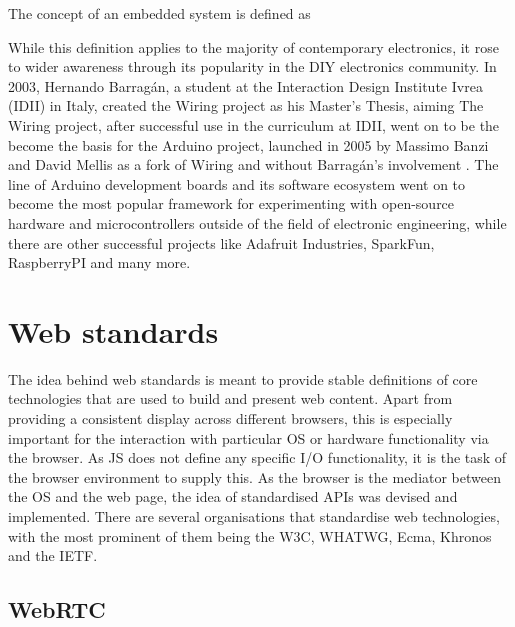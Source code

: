 The concept of an embedded system is defined as 

While this definition applies to the majority of contemporary electronics, it rose to wider awareness through its popularity in the \ac{DIY} electronics community. In 2003, Hernando Barragán, a student at the Interaction Design Institute Ivrea (IDII) in Italy, created the Wiring project as his Master's Thesis, aiming  The Wiring project, after successful use in the curriculum at IDII, went on to be the become the basis for the Arduino project, launched in 2005 by Massimo Banzi and David Mellis as a fork of Wiring and without Barragán's involvement \parencite{arduinoHistory}. The line of Arduino development boards and its software ecosystem went on to become the most popular framework for experimenting with open-source hardware and microcontrollers outside of the field of electronic engineering, while there are other successful projects like Adafruit Industries, SparkFun, RaspberryPI and many more.


\section{Web standards}

The idea behind web standards is meant to provide stable definitions of core technologies that are used to build and present web content. Apart from providing a consistent display across different browsers, this is especially important for the interaction with particular \ac{OS} or hardware functionality via the browser. As \ac{JS} does not define any specific \ac{I/O} functionality, it is the task of the browser environment to supply this. As the browser is the mediator between the \ac{OS} and the web page, the idea of standardised \ac{API}s was devised and implemented. There are several organisations that standardise web technologies, with the most prominent of them being the \ac{W3C}, \ac{WHATWG}, Ecma, Khronos and the \ac{IETF}.

\subsection{WebRTC}


